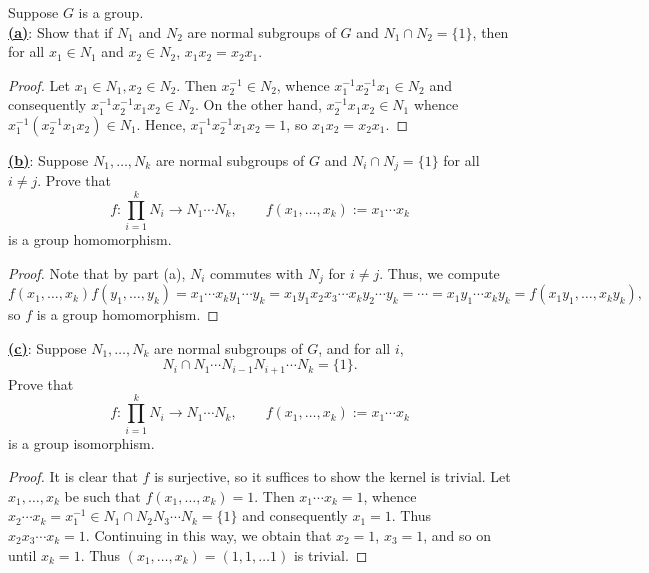 \documentclass[12pt]{article}
\begin{document}
\begin{homeworkProblem}
  Suppose $G$ is a group.\\

  \underline{\textbf{(a)}}: Show that if $N_1$ and $N_2$ are normal subgroups of $G$ and $N_1 \cap N_2 = \{1\}$, then for all $x_1 \in N_1$ and $x_2 \in N_2$, $x_1x_2 = x_2x_1$.

  \begin{proof}
    Let $ x_{1}\in N_{1}, x_{2}\in N_{2} $. Then $ x_{2}^{-1}\in N_{2} $, whence $ x_{1}^{-1}x_{2}^{-1}x_{1}\in N_{2}  $ and consequently $ x_{1}^{-1}x_{2}^{-1}x_{1}x_{2}\in N_{2} $. On the other hand, $ x_{2}^{-1}x_{1}x_{2}\in N_{1} $ whence $ x_{1}^{-1}(x_{2}^{-1}x_{1}x_{2}) \in N_{1} $. Hence, $ x_{1}^{-1}x_{2}^{-1}x_{1}x_{2} = 1 $, so $ x_{1}x_{2}= x_{2}x_{1} $.
  \end{proof}

  \underline{\textbf{(b)}}: Suppose $N_1, \dots, N_k$ are normal subgroups of $G$ and $N_i \cap N_j = \{1\}$ for all $i \neq j$. Prove that
  \[
    f : \prod_{i=1}^{k} N_i \to N_1 \cdots N_k, \qquad f(x_1, \dots, x_k) := x_1 \cdots x_k
  \]
  is a group homomorphism.

  \begin{proof}
    Note that by part (a), $ N_{i} $ commutes with $ N_{j} $ for $ i\neq j $. Thus, we compute
     \[
       f(x_{1},\ldots, x_{k})f(y_{1},\ldots, y_{k}) = x_{1}\cdots x_{k} y_{1}\cdots y_{k} = x_{1}y_{1} x_{2}x_{3} \cdots x_{k} y_{2}\cdots y_{k} = \cdots = x_{1}y_{1}\cdots x_{k}y_{k} = f(x_{1}y_{1},\ldots, x_{k}y_{k}),
     \]
     so $ f $ is a group homomorphism.
  \end{proof}

  \underline{\textbf{(c)}}: Suppose $N_1, \dots, N_k$ are normal subgroups of $G$, and for all $i$,
  \[
    N_i \cap N_1 \cdots N_{i-1} N_{i+1} \cdots N_k = \{1\}.
  \]
  Prove that
  \[
    f : \prod_{i=1}^{k} N_i \to N_1 \cdots N_k, \qquad f(x_1, \dots, x_k) := x_1 \cdots x_k
  \]
  is a group isomorphism.

  \begin{proof}
    It is clear that $ f $ is surjective, so it suffices to show the kernel is trivial. Let $ x_{1},\ldots, x_{k} $ be such that $ f(x_{1},\ldots, x_{k})= 1 $. Then $ x_{1}\cdots x_{k}= 1 $, whence $ x_{2}\cdots x_{k} = x_{1}^{-1}\in N_{1}\cap N_{2}N_{3}\cdots N_{k} = \{1\} $  and consequently $ x_{1}= 1 $. Thus $ x_{2}x_{3}\cdots x_{k} = 1 $. Continuing in this way, we obtain that $ x_{2} = 1 $, $ x_{3}= 1 $, and so on until $ x_{k}=1 $. Thus $ (x_{1},\ldots, x_{k}) = (1,1,\ldots 1) $ is trivial.
  \end{proof}
\end{homeworkProblem}
\end{document}
